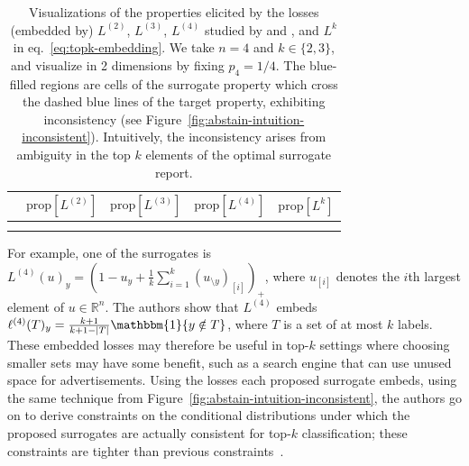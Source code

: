 \documentclass[twoside,11pt]{article}
\newcommand{\reals}{\mathbb{R}}
\newcommand{\prop}[1]{\mathrm{prop}[#1]}
\newcommand{\Li}[1]{L^{(#1)}}
\newcommand{\elli}[1]{\ell^{(#1)}}
\newcommand{\ones}{\mathbbm{1}}
\begin{document}
\begin{table}
	\centering
	\begin{tabular}{ccccc}
		& $\prop{\Li{2}}$ & $\prop{\Li{3}}$ & $\prop{\Li{4}}$ & $\prop{L^k}$\\
		\hline \hline
		\rotatebox[origin=c]{90}{$k = 2$\hspace*{-2.5cm}} &  &  &  & \\ 
		\rotatebox[origin=c]{90}{$k = 3$\hspace*{-2.5cm}} &  &  &  & \\ 
	\end{tabular}
	\caption{
		Visualizations of the properties elicited by the losses (embedded by) $\Li{2}$, $\Li{3}$, $\Li{4}$ studied by \citet{yang2018consistency} and \citet{finocchiaro2022consistenttopk}, and $L^k$ in eq.~\eqref{eq:topk-embedding}.
    We take $n=4$ and $k \in \{2,3\}$, and visualize in 2 dimensions by fixing $p_4 = 1/4$. 
		The blue-filled regions are cells of the surrogate property which cross the dashed blue lines of the target property, exhibiting inconsistency (see Figure~\ref{fig:abstain-intuition-inconsistent}).
    Intuitively, the inconsistency arises from ambiguity in the top $k$ elements of the optimal surrogate report.  
	}
	\label{tab:loss-slices}
\end{table}

For example, one of the surrogates is $\Li {4}(u)_y = \left(1 - u_y + \frac 1 k \sum_{i=1}^k (u_{\setminus y})_{[i]}\right)_+$, where $u_{[i]}$ denotes the $i$th largest element of $u \in \reals^n$.
The authors show that $\Li{4}$ embeds $\ell^{(4)}(T)_y = \tfrac {k+1} {k+1-|T|} \ones\{y\notin T\}$, where $T$ is a set of at most $k$ labels.
These embedded losses may therefore be useful in top-$k$ settings where choosing smaller sets may have some benefit, such as a search engine that can use unused space for advertisements.
Using the losses each proposed surrogate embeds, using the same technique from Figure~\ref{fig:abstain-intuition-inconsistent}, the authors go on to derive constraints on the conditional distributions under which the proposed surrogates are actually consistent for top-$k$ classification; these constraints are tighter than previous constraints~\citep{yang2018consistency}.
\end{document}
